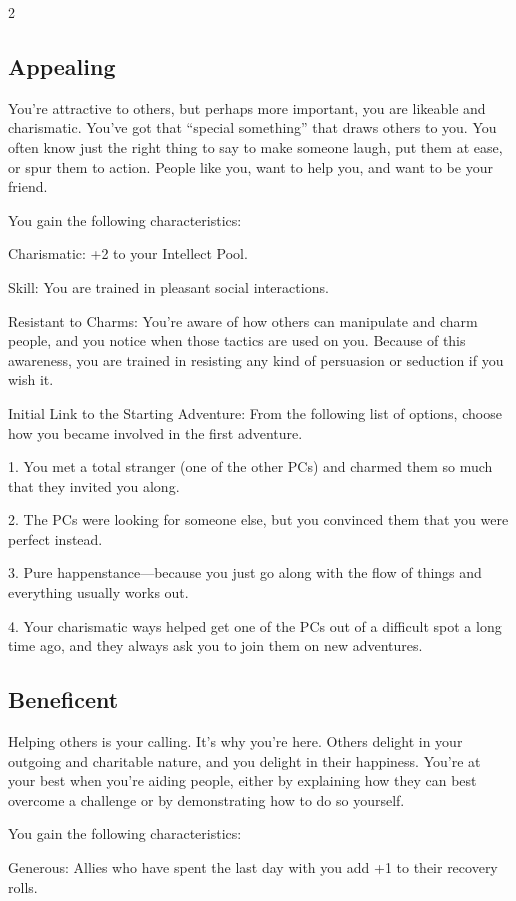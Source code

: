\begin{multicols}{2}
\subsection{Appealing}
You’re attractive to others, but perhaps more important, you are likeable and charismatic. You’ve got that “special something” that draws others to you. You often know just the right thing to say to make someone laugh, put them at ease, or spur them to action. People like you, want to help you, and want to be your friend.

You gain the following characteristics:

Charismatic: +2 to your Intellect Pool.

Skill: You are trained in pleasant social interactions.

Resistant to Charms: You’re aware of how others can manipulate and charm people, and you notice when those tactics are used on you. Because of this awareness, you are trained in resisting any kind of persuasion or seduction if you wish it.

Initial Link to the Starting Adventure: From the following list of options, choose how you became involved in the first adventure.

1. You met a total stranger (one of the other PCs) and charmed them so much that they invited you along. 

2. The PCs were looking for someone else, but you convinced them that you were perfect instead. 

3. Pure happenstance—because you just go along with the flow of things and everything usually works out.

4. Your charismatic ways helped get one of the PCs out of a difficult spot a long time ago, and they always ask you to join them on new adventures.

\subsection{Beneficent}

Helping others is your calling. It’s why you’re here. Others delight in your outgoing and charitable nature, and you delight in their happiness. You’re at your best when you’re aiding people, either by explaining how they can best overcome a challenge or by demonstrating how to do so yourself.

You gain the following characteristics:

Generous: Allies who have spent the last day with you add +1 to their recovery rolls.


\end{multicols}
